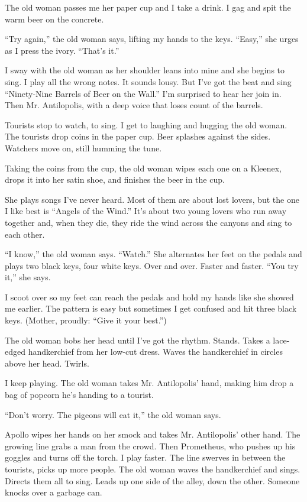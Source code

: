 \documentclass[twoside,10pt]{book}
\begin{document}
The old woman passes me her paper cup and I take a drink. I gag and spit
the warm beer on the concrete.

``Try again,'' the old woman says, lifting my hands to the keys.
``Easy,'' she urges as I press the ivory. ``That's it.''

I sway with the old woman as her shoulder leans into mine and she begins
to sing. I play all the wrong notes. It sounds lousy. But I've got the
beat and sing ``Ninety-Nine Barrels of Beer on the Wall.'' I'm surprised
to hear her join in. Then Mr. Antilopolis, with a deep voice that loses
count of the barrels.

Tourists stop to watch, to sing. I get to laughing and hugging the old
woman. The tourists drop coins in the paper cup. Beer splashes against
the sides. Watchers move on, still humming the tune.

Taking the coins from the cup, the old woman wipes each one on a
Kleenex, drops it into her satin shoe, and finishes the beer in the cup.

She plays songs I've never heard. Most of them are about lost lovers,
but the one I like best is ``Angels of the Wind.'' It's about two young
lovers who run away together and, when they die, they ride the wind
across the canyons and sing to each other.

``I know,'' the old woman says. ``Watch.'' She alternates her feet on
the pedals and plays two black keys, four white keys. Over and over.
Faster and faster. ``You try it,'' she says.

I scoot over so my feet can reach the pedals and hold my hands like she
showed me earlier. The pattern is easy but sometimes I get confused and
hit three black keys. (Mother, proudly: ``Give it your best.'')

The old woman bobs her head until I've got the rhythm. Stands. Takes a
lace-edged hand­kerchief from her low-cut dress. Waves the handkerchief
in circles above her head. Twirls.

I keep playing. The old woman takes Mr. Antilopolis' hand, making him
drop a bag of pop­corn he's handing to a tourist.

``Don't worry. The pigeons will eat it,'' the old woman says.

Apollo wipes her hands on her smock and takes Mr. Antilopolis' other
hand. The growing line grabs a man from the crowd. Then Prometheus, who
pushes up his goggles and turns off the torch. I play faster. The line
swerves in between the tourists, picks up more people. The old woman
waves the handkerchief and sings. Directs them all to sing. Leads up one
side of the alley, down the other. Someone knocks over a garbage can.
\end{document}

